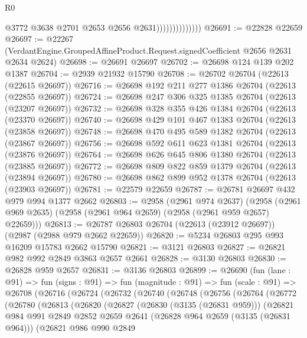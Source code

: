 \begin{lexlean}{R0}
\begin{coremodule}
                                @3772
                                @3638
                                @2701
                                @2653
                                @2656
                                @2631))))))))))))))
@26691 := @22828 @22659
@26697 := @22267
    (VerdantEngine.GroupedAffineProduct.Request.signedCoefficient @2656 @2631 @2634 @2624)
@26698 := @26691 @26697
@26702 := @26698 @124 @139 @202 @1387
@26704 := @2939 @21932 @15790
@26708 := @26702 @26704 (@22613 (@22615 @26697))
@26716 := @26698 @192 @211 @277 @1386 @26704 (@22613 (@22855 @26697))
@26724 := @26698 @247 @306 @325 @1385 @26704 (@22613 (@23207 @26697))
@26732 := @26698 @328 @355 @426 @1384 @26704 (@22613 (@23370 @26697))
@26740 := @26698 @429 @101 @467 @1383 @26704 (@22613 (@23858 @26697))
@26748 := @26698 @470 @495 @589 @1382 @26704 (@22613 (@23867 @26697))
@26756 := @26698 @592 @611 @623 @1381 @26704 (@22613 (@23876 @26697))
@26764 := @26698 @626 @645 @806 @1380 @26704 (@22613 (@23885 @26697))
@26772 := @26698 @809 @822 @859 @1379 @26704 (@22613 (@23894 @26697))
@26780 := @26698 @862 @899 @952 @1378 @26704 (@22613 (@23903 @26697))
@26781 := @22579 @22659
@26787 := @26781 @26697 @432 @979 @994 @1377 @2662
@26803 := @2958
    (@2961 @974 @2637)
    (@2958 (@2961 @969 @2635) (@2958 (@2961 @964 @2659) (@2958 (@2961 @959 @2657) @22659)))
@26813 := @26787 @26803 @26704 (@22613 (@23912 @26697)) (@2987 (@2988 @979 @2662 @22659))
@26820 := @5234 @26803 @295 @993 @16209 @15783 @2662 @15790
@26821 := @3121 @26803
@26827 := @26821 @982 @992 @2849 @3863 @2657 @2661
@26828 := @3130 @26803
@26830 := @26828 @959 @2657
@26831 := @3136 @26803
@26899 := @26690
    (fun (lane : @91) =>
    fun (signs : @91) =>
    fun (magnitude : @91) =>
    fun (scale : @91) =>
    @26708
      (@26716
        (@26724
          (@26732
            (@26740
              (@26748
                (@26756
                  (@26764
                    (@26772
                      (@26780
                        (@26813
                          (@26820
                            (@26827
                              (@26830 (@3135 (@26831 @959)))
                              (@26821
                                @984
                                @991
                                @2849
                                @2852
                                @2659
                                @2641
                                (@26828 @964 @2659 (@3135 (@26831 @964)))
                                (@26821
                                  @986
                                  @990
                                  @2849

\end{coremodule}
\end{lexlean}
